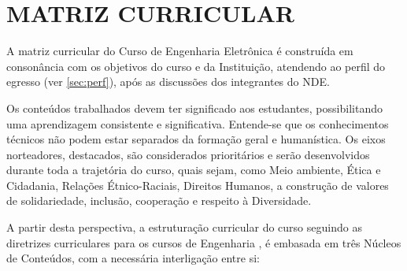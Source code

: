 



\section{MATRIZ CURRICULAR}

A matriz curricular do Curso de Engenharia Eletrônica é construída em consonância com os objetivos do curso e da Instituição, atendendo ao perfil do egresso (ver \autoref{sec:perf}), após as discussões dos integrantes do NDE.

Os conteúdos trabalhados devem ter significado aos estudantes, possibilitando uma aprendizagem consistente e significativa. Entende-se que os conhecimentos técnicos não podem estar separados da formação geral e humanística. Os eixos norteadores, destacados, são considerados prioritários e serão desenvolvidos durante toda a trajetória do curso, quais sejam, como Meio ambiente, Ética e Cidadania, Relações Étnico-Raciais, Direitos Humanos, a construção de valores de solidariedade, inclusão, cooperação e respeito à Diversidade.

A partir desta perspectiva, a estruturação curricular do curso seguindo as diretrizes curriculares para os cursos de Engenharia \cite{dcneng}, é embasada em três Núcleos de Conteúdos, com a necessária interligação entre si:

